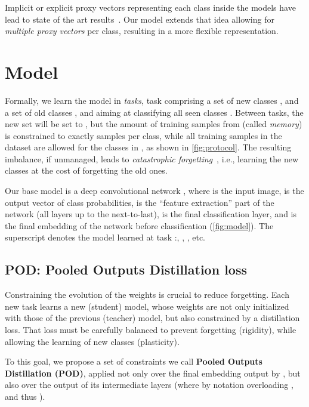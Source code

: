 \documentclass[runningheads]{llncs}
\begin{document}
Implicit or explicit proxy vectors representing each class inside the models have lead to state of the art results~\cite{rebuffi2017icarl,hou2019ucir}. Our model extends that idea allowing for \textit{multiple proxy vectors} per class, resulting in a more flexible representation.
\section{Model}
\label{sec:model}

Formally, we learn the model in  \textit{tasks}, task  comprising a set of new classes , and a set of old classes , and aiming at classifying all seen classes . Between tasks, the new set  will be set to , but the amount of training samples from  (called \textit{memory}) is constrained to exactly  samples per class, while all training samples in the dataset are allowed for the classes in , as shown in \autoref{fig:protocol}. The resulting imbalance, if unmanaged, leads to \textit{catastrophic forgetting}~\cite{robins1995catastrophicforgetting,french1999catastrophicforgetting}, i.e., learning the new classes at the cost of forgetting the old ones.

Our base model is a deep convolutional network , where  is the input image,  is the output vector of class probabilities,  is the ``feature extraction'' part of the network (all layers up to the next-to-last),  is the final classification layer, and  is the final embedding of the network before classification (\autoref{fig:model}). The superscript  denotes the model learned at task :, , , etc.










\subsection{POD: Pooled Outputs Distillation loss}
\label{sec:distillation}

Constraining the evolution of the weights is crucial to reduce forgetting. Each new task  learns a new (student) model, whose weights are not only initialized with those of the previous (teacher) model, but also constrained by a distillation loss. That loss must be carefully balanced to prevent forgetting (rigidity), while allowing the learning of new classes (plasticity).

To this goal, we propose a set of constraints we call \textbf{Pooled Outputs Distillation (POD)}, applied not only over the final embedding output by , but also over the output of its intermediate layers  (where by notation overloading
, and thus
).
\end{document}
